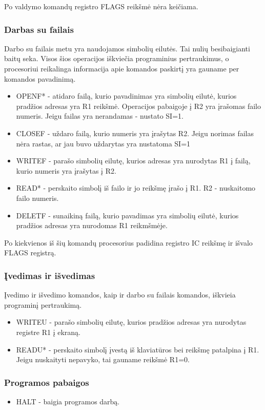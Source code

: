 \documentclass{VUMIFInfKursinis}
\begin{document}
Po valdymo komandų registro FLAGS reikšmė nėra keičiama.

\subsubsection{Darbas su failais}
Darbo su failais metu yra naudojamos simbolių eilutės. Tai nulių besibaigianti baitų seka. Visos šios operacijos iškviečia programinius pertraukimus, o procesoriui reikalinga informacija apie komandos paskirtį yra gauname per komandos pavadinimą.
\begin{itemize}
	\item OPENF* - atidaro failą, kurio pavadinimas yra simbolių eilutė, kurios pradžios adresas yra R1 reikšmė. Operacijos pabaigoje į R2 yra įrašomas failo numeris. Jeigu failas yra nerandamas - nustato SI=1.
	\item CLOSEF - uždaro failą, kurio numeris yra įrašytas  R2. Jeigu norimas failas nėra rastas, ar jau buvo uždarytas yra nustatoma SI=1
	\item WRITEF - parašo simbolių eilutę, kurios adresas yra nurodytas R1 į failą, kurio numeris yra įrašytas į R2.
	\item READ* - perskaito simbolį iš failo ir jo reikšmę įrašo į R1. R2 - nuskaitomo failo numeris.
	\item DELETF - sunaikiną failą, kurio pavadimas yra simbolių eilutė, kurios pradžios adresas yra nurodomas R1 reikmšmėje.
\end{itemize}

Po kiekvienos iš šių komandų procesorius padidina registro IC reikšmę ir išvalo FLAGS registrą.

\subsubsection{Įvedimas ir išvedimas}
Įvedimo ir išvedimo komandos, kaip ir darbo su failais komandos, iškvieia programinį pertraukimą.
\begin{itemize}
	\item WRITEU - parašo simbolių eilutę, kurios pradžios adresas yra nurodytas registre R1 į ekraną.
	\item READU* - perskaito simbolį įvestą iš klaviatūros bei reikšmę patalpina į R1. Jeigu nuskaityti nepavyko, tai gauname reikšmė R1=0.
\end{itemize}

\subsubsection{Programos pabaigos}
\begin{itemize}
	\item HALT - baigia programos darbą.
\end{itemize}
\end{document}

